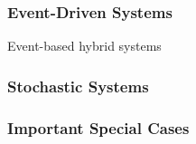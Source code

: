 
\subsubsection{Event-Driven Systems}

Event-based hybrid systems


\subsubsection{Stochastic Systems}


\subsubsection{Important Special Cases} \label{s:system_subclasses}

